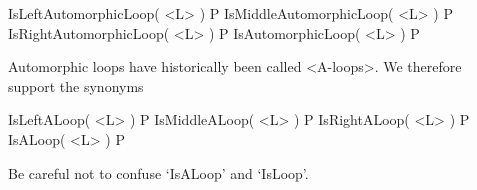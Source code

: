 \>IsLeftAutomorphicLoop( <L> ) P
\>IsMiddleAutomorphicLoop( <L> ) P
\>IsRightAutomorphicLoop( <L> ) P
\>IsAutomorphicLoop( <L> ) P

Automorphic loops have historically been called <A-loops>. We therefore support the synonyms

\>IsLeftALoop( <L> ) P
\>IsMiddleALoop( <L> ) P
\>IsRightALoop( <L> ) P
\>IsALoop( <L> ) P

Be careful not to confuse `IsALoop' and `IsLoop'.